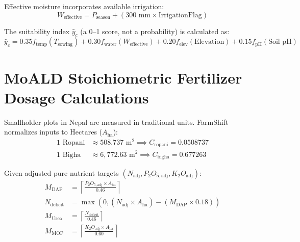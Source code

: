 \documentclass[11pt,a4paper]{report}
\begin{document}
Effective moisture incorporates available irrigation:
\begin{equation}
  W_{\text{effective}} = P_{\text{season}} + (300\text{ mm} \times \text{IrrigationFlag})
\end{equation}

The suitability index $\hat{y}_c$ (a 0--1 score, not a probability) is calculated as:
\begin{equation}
  \hat{y}_c = 0.35 f_{\text{temp}}(T_{\text{sowing}}) + 0.30 f_{\text{water}}(W_{\text{effective}}) + 0.20 f_{\text{elev}}(\text{Elevation}) + 0.15 f_{\text{pH}}(\text{Soil pH})
\end{equation}

\section{MoALD Stoichiometric Fertilizer Dosage Calculations}
Smallholder plots in Nepal are measured in traditional units. FarmShift normalizes inputs to Hectares ($A_{\text{ha}}$):
\begin{align}
  1\text{ Ropani} &\approx 508.737\text{ m}^2 \implies C_{\text{ropani}} = 0.0508737 \\
  1\text{ Bigha} &\approx 6,772.63\text{ m}^2 \implies C_{\text{bigha}} = 0.677263
\end{align}

Given adjusted pure nutrient targets $(N_{\text{adj}}, P_2O_{5,\text{adj}}, K_2O_{\text{adj}})$:
\begin{align}
  M_{\text{DAP}} &= \left\lceil \frac{P_2O_{5,\text{adj}} \times A_{\text{ha}}}{0.46} \right\rceil \\
  N_{\text{deficit}} &= \max\left(0, (N_{\text{adj}} \times A_{\text{ha}}) - (M_{\text{DAP}} \times 0.18)\right) \\
  M_{\text{Urea}} &= \left\lceil \frac{N_{\text{deficit}}}{0.46} \right\rceil \\
  M_{\text{MOP}} &= \left\lceil \frac{K_2O_{\text{adj}} \times A_{\text{ha}}}{0.60} \right\rceil
\end{align}
\end{document}
